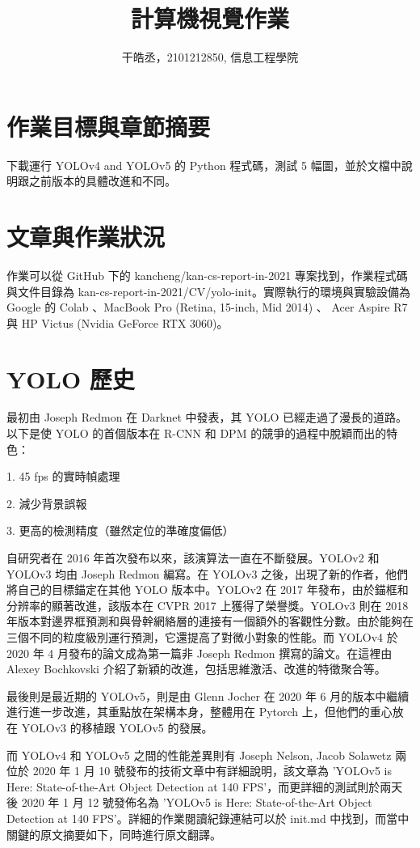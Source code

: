 \documentclass[10pt,UTF8]{ctexart}
\title{計算機視覺作業}
\author{干皓丞，2101212850, 信息工程學院}
\begin{document}
\maketitle


\section{作業目標與章節摘要}

下載運行 YOLOv4 and YOLOv5 的 Python 程式碼，測試 5 幅圖，並於文檔中說明跟之前版本的具體改進和不同。

\section{文章與作業狀況}

作業可以從 GitHub 下的 kancheng/kan-cs-report-in-2021 專案找到，作業程式碼與文件目錄為 kan-cs-report-in-2021/CV/yolo-init。實際執行的環境與實驗設備為 Google 的 Colab 、MacBook Pro (Retina, 15-inch, Mid 2014) 、 Acer Aspire R7 與 HP Victus (Nvidia GeForce RTX 3060)。


\section{YOLO 歷史}

最初由 Joseph Redmon 在 Darknet 中發表，其 YOLO 已經走過了漫長的道路。以下是使 YOLO 的首個版本在 R-CNN 和 DPM 的競爭的過程中脫穎而出的特色：

1. 45 fps 的實時幀處理

2. 減少背景誤報

3. 更高的檢測精度（雖然定位的準確度偏低）

自研究者在 2016 年首次發布以來，該演算法一直在不斷發展。YOLOv2 和 YOLOv3 均由 Joseph Redmon 編寫。在 YOLOv3 之後，出現了新的作者，他們將自己的目標錨定在其他 YOLO 版本中。YOLOv2 在 2017 年發布，由於錨框和分辨率的顯著改進，該版本在 CVPR 2017 上獲得了榮譽獎。YOLOv3 則在 2018 年版本對邊界框預測和與骨幹網絡層的連接有一個額外的客觀性分數。由於能夠在三個不同的粒度級別運行預測，它還提高了對微小對象的性能。而 YOLOv4 於 2020 年 4 月發布的論文成為第一篇非 Joseph Redmon 撰寫的論文。在這裡由 Alexey Bochkovski 介紹了新穎的改進，包括思維激活、改進的特徵聚合等。

最後則是最近期的 YOLOv5，則是由 Glenn Jocher 在 2020 年 6 月的版本中繼續進行進一步改進，其重點放在架構本身，整體用在 Pytorch 上，但他們的重心放在 YOLOv3 的移植跟 YOLOv5 的發展。

而 YOLOv4 和 YOLOv5 之間的性能差異則有 Joseph Nelson, Jacob Solawetz 兩位於 2020 年 1 月 10 號發布的技術文章中有詳細說明，該文章為 'YOLOv5 is Here: State-of-the-Art Object Detection at 140 FPS'，而更詳細的測試則於兩天後 2020 年 1 月 12 號發佈名為 'YOLOv5 is Here: State-of-the-Art Object Detection at 140 FPS'。詳細的作業閱讀紀錄連結可以於 init.md 中找到，而當中關鍵的原文摘要如下，同時進行原文翻譯。
\end{document}
